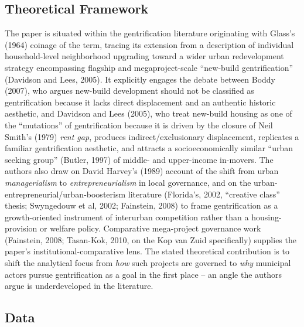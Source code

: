 \subsection*{Theoretical Framework}

The paper is situated within the gentrification literature originating with Glass's (1964) coinage of the term, tracing its extension from a description of individual household-level neighborhood upgrading toward a wider urban redevelopment strategy encompassing flagship and megaproject-scale ``new-build gentrification'' (Davidson and Lees, 2005). It explicitly engages the debate between Boddy (2007), who argues new-build development should not be classified as gentrification because it lacks direct displacement and an authentic historic aesthetic, and Davidson and Lees (2005), who treat new-build housing as one of the ``mutations'' of gentrification because it is driven by the closure of Neil Smith's (1979) \emph{rent gap}, produces indirect/exclusionary displacement, replicates a familiar gentrification aesthetic, and attracts a socioeconomically similar ``urban seeking group'' (Butler, 1997) of middle- and upper-income in-movers. The authors also draw on David Harvey's (1989) account of the shift from urban \emph{managerialism} to \emph{entrepreneurialism} in local governance, and on the urban-entrepreneurial/urban-boosterism literature (Florida's, 2002, ``creative class'' thesis; Swyngedouw et al, 2002; Fainstein, 2008) to frame gentrification as a growth-oriented instrument of interurban competition rather than a housing-provision or welfare policy. Comparative mega-project governance work (Fainstein, 2008; Tasan-Kok, 2010, on the Kop van Zuid specifically) supplies the paper's institutional-comparative lens. The stated theoretical contribution is to shift the analytical focus from \emph{how} such projects are governed to \emph{why} municipal actors pursue gentrification as a goal in the first place -- an angle the authors argue is underdeveloped in the literature.

\subsection*{Data}


